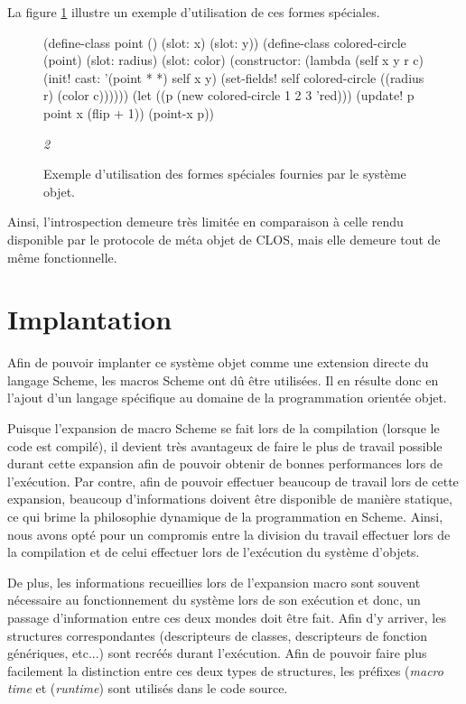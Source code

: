 \documentclass[12pt,oneside,letterpaper,francais]{book}
\newcommand{\scheme}[1]{\selectlanguage{english}{\tt #1}\selectlanguage{french}}
\newcommand{\schemeresult}[1]{{\it #1}}
\begin{document}
La figure \ref{OO:specform} illustre un exemple d'utilisation de ces
formes spéciales.

\begin{figure}[htb!]
  \begin{schemecode}
(define-class point () (slot: x) (slot: y))
(define-class colored-circle (point) (slot: radius) (slot: color)
  (constructor:
   (lambda (self x y r c)
     (init! cast: '(point * *) self x y)
     (set-fields! self colored-circle ((radius r) (color c))))))
(let ((p (new colored-circle 1 2 3 'red)))
  (update! p point x (flip + 1))
  (point-x p))
  \end{schemecode}
  \schemeresult{2}
  \caption{Exemple d'utilisation des formes spéciales fournies par le
    système objet.}
  \label{OO:specform}
\end{figure}

Ainsi, l'introspection demeure très limitée en comparaison à celle
rendu disponible par le protocole de méta objet de CLOS, mais elle
demeure tout de même fonctionnelle.


\section{Implantation}

Afin de pouvoir implanter ce système objet comme une extension directe
du langage Scheme, les macros Scheme ont dû être utilisées. Il en
résulte donc en l'ajout d'un langage spécifique au domaine de la
programmation orientée objet.

Puisque l'expansion de macro Scheme se fait lors de la compilation
(lorsque le code est compilé), il devient très avantageux de faire le
plus de travail possible durant cette expansion afin de pouvoir
obtenir de bonnes performances lors de l'exécution. Par contre, afin
de pouvoir effectuer beaucoup de travail lors de cette expansion,
beaucoup d'informations doivent être disponible de manière statique,
ce qui brime la philosophie dynamique de la programmation en
Scheme. Ainsi, nous avons opté pour un compromis entre la division du
travail effectuer lors de la compilation et de celui effectuer lors de
l'exécution du système d'objets.

De plus, les informations recueillies lors de l'expansion macro sont
souvent nécessaire au fonctionnement du système lors de son exécution
et donc, un passage d'information entre ces deux mondes doit être
fait. Afin d'y arriver, les structures correspondantes (descripteurs
de classes, descripteurs de fonction génériques, etc...) sont recréés
durant l'exécution. Afin de pouvoir faire plus facilement la
distinction entre ces deux types de structures, les préfixes
\scheme{mt} (\textit{macro time} et \scheme{rt} (\textit{runtime})
sont utilisés dans le code source.
\end{document}
